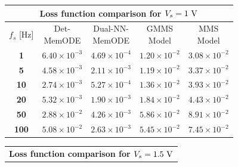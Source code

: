 \documentclass[lettersize,journal]{IEEEtran}
\begin{document}
\begin{table}
\begin{tabular}{c|cccc}
    \multicolumn{5}{c}{\textbf{Loss function comparison for \(V_s = 1 \rm \ V\)}}                                                                                              \\
    \midrule
    \(f_s\) [Hz] & \makecell{Det-                                                                                                                                              \\MemODE}             & \makecell{Dual-NN-                                                                                                             \\ MemODE}                 & \makecell{GMMS\\Model}             & \makecell{MMS\\Model}                                        \\
    \midrule
    \textbf{1}   & \(6.40 \times 10^{-3}\) & \color{ieeegreen} \bfseries \(4.69 \times 10^{-4}\) & \(1.20 \times 10^{-2}\) & \color{ieeered} \bfseries \(3.08 \times 10^{-2}\) \\
    \textbf{5}   & \(4.58 \times 10^{-3}\) & \color{ieeegreen} \bfseries \(2.11 \times 10^{-3}\) & \(1.19 \times 10^{-2}\) & \color{ieeered} \bfseries \(3.37 \times 10^{-2}\) \\
    \textbf{10}  & \(2.74 \times 10^{-3}\) & \color{ieeegreen} \bfseries \(5.27 \times 10^{-4}\) & \(1.36 \times 10^{-2}\) & \color{ieeered} \bfseries \(3.93 \times 10^{-2}\) \\
    \textbf{20}  & \(5.32 \times 10^{-3}\) & \color{ieeegreen} \bfseries \(1.90 \times 10^{-3}\) & \(1.84 \times 10^{-2}\) & \color{ieeered} \bfseries \(4.43 \times 10^{-2}\) \\
    \textbf{50}  & \(2.88 \times 10^{-2}\) & \color{ieeegreen} \bfseries \(4.26 \times 10^{-3}\) & \(5.86 \times 10^{-2}\) & \color{ieeered} \bfseries \(8.91 \times 10^{-2}\) \\
    \textbf{100} & \(5.08 \times 10^{-2}\) & \color{ieeegreen} \bfseries \(2.63 \times 10^{-3}\) & \(5.45 \times 10^{-2}\) & \color{ieeered} \bfseries \(7.45 \times 10^{-2}\) \\
    \bottomrule
  \end{tabular}
  \begin{tabular}{c|cccc}
    \toprule
    \multicolumn{5}{c}{\textbf{Loss function comparison for \(V_s = 1.5 \rm \ V\)}}                                                                                                                      \\

\end{tabular}
\end{table}
\end{document}
